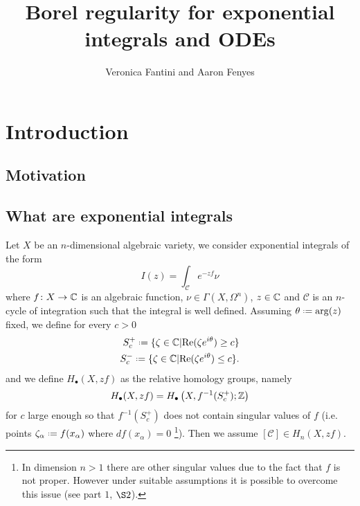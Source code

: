 \documentclass[11pt,a4paper,twoside,leqno,noamsfonts]{amsart}
\title[Borel regularity for exponential integrals and ODEs]{Borel regularity for exponential integrals and ODEs\\ [1ex]
  }
\author{
Veronica Fantini and  Aaron Fenyes 
}
\numberwithin{equation}{section}
\begin{document}
\maketitle
\tableofcontents

\section{Introduction}

\subsection{Motivation}

\subsection{What are exponential integrals}

Let $X$ be an $n$-dimensional algebraic variety, we consider exponential integrals of the form 
\begin{equation}
\label{:exp_integral}
I(z)=\int_{\mathcal{C}}e^{-zf}\nu
\end{equation}
where $f\colon X\to \mathbb C$ is an algebraic function, $\nu\in\Gamma(X,\Omega^n)$, $z\in\mathbb C$ and $\mathcal{C}$ is an $n$-cycle of integration such that the integral is well defined. Assuming $\theta\defeq\arg(z)$ fixed, we define for every $c>0$ 
\begin{align*}
S^+_c\defeq\lbrace \zeta\in\C\vert \mathrm{Re}(\zeta e^{i\theta})\geq c\rbrace\\
S^-_c\defeq\lbrace \zeta\in\C\vert \mathrm{Re}(\zeta e^{i\theta})\leq c\rbrace.
\end{align*}
and we define $H_\bullet(X,zf)$ as the relative homology groups, namely \[H_{\bullet}(X,zf)=H_{\bullet}\left(X,f^{-1}(S_c^+);\mathbb Z\right)\] for $c$ large enough so that $f^{-1}(S_c^+)$ does not contain singular values of $f$ (i.e. points $\zeta_\alpha\defeq f(x_\alpha)$ where $df(x_\alpha)=0$ \footnote{In dimension $n>1$ there are other singular values due to the fact that $f$ is not proper. However under suitable assumptions it is possible to overcome this issue (see \cite{pham} part $1$, $\S 2$).}). Then we assume $[\mathcal{C}]\in H_n(X,zf)$. 
\end{document}

